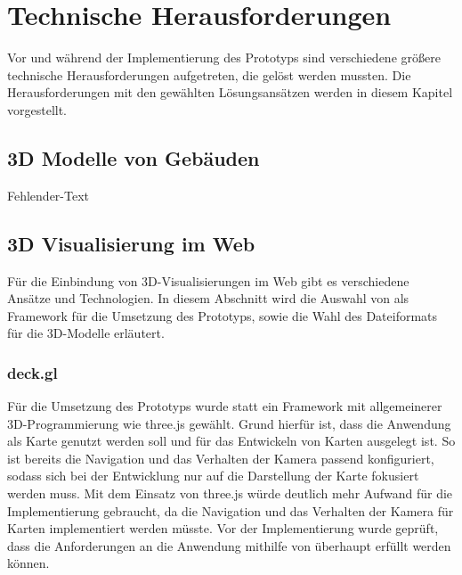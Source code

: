 \newpage
\section{Technische Herausforderungen}
Vor und während der Implementierung des Prototyps sind verschiedene größere technische Herausforderungen aufgetreten, die gelöst werden mussten. Die Herausforderungen mit den gewählten Lösungsansätzen werden in diesem Kapitel vorgestellt. 

\subsection{3D Modelle von Gebäuden}
Fehlender-Text

\subsection{3D Visualisierung im Web}
Für die Einbindung von 3D-Visualisierungen im Web gibt es verschiedene Ansätze und Technologien. In diesem Abschnitt wird die Auswahl von \deckgl{} als Framework für die Umsetzung des Prototyps, sowie die Wahl des Dateiformats für die 3D-Modelle erläutert.

\subsubsection{deck.gl}
Für die Umsetzung des Prototyps wurde \deckgl{} statt ein Framework mit allgemeinerer 3D-Programmierung wie three.js gewählt. Grund hierfür ist, dass die Anwendung als Karte genutzt werden soll und \deckgl{} für das Entwickeln von Karten ausgelegt ist. So ist bereits die Navigation und das Verhalten der Kamera passend konfiguriert, sodass sich bei der Entwicklung nur auf die Darstellung der Karte fokusiert werden muss. Mit dem Einsatz von three.js würde deutlich mehr Aufwand für die Implementierung gebraucht, da die Navigation und das Verhalten der Kamera für Karten implementiert werden müsste. Vor der Implementierung wurde geprüft, dass die Anforderungen an die Anwendung mithilfe von \deckgl{} überhaupt erfüllt werden können.

